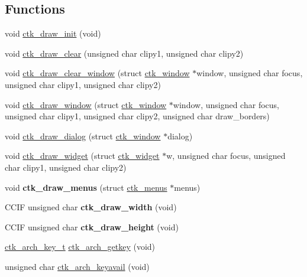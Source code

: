 \subsection*{Functions}
\begin{DoxyCompactItemize}
\item 
void \hyperlink{group__ctkdraw_ga271a33b474a94da63244e94c84127303}{ctk\+\_\+draw\+\_\+init} (void)
\item 
void \hyperlink{group__ctkdraw_gae6e8805e52467b2942c2af3e0080b6e1}{ctk\+\_\+draw\+\_\+clear} (unsigned char clipy1, unsigned char clipy2)
\item 
void \hyperlink{group__ctkdraw_gaeade88277aa23594cd8dc9f4caeba46d}{ctk\+\_\+draw\+\_\+clear\+\_\+window} (struct \hyperlink{structctk__window}{ctk\+\_\+window} $\ast$window, unsigned char focus, unsigned char clipy1, unsigned char clipy2)
\item 
void \hyperlink{group__ctkdraw_gae172d39b14556ee88707d4e6979abb34}{ctk\+\_\+draw\+\_\+window} (struct \hyperlink{structctk__window}{ctk\+\_\+window} $\ast$window, unsigned char focus, unsigned char clipy1, unsigned char clipy2, unsigned char draw\+\_\+borders)
\item 
void \hyperlink{group__ctkdraw_gae973e0af36f51f685e88216fa10ceb56}{ctk\+\_\+draw\+\_\+dialog} (struct \hyperlink{structctk__window}{ctk\+\_\+window} $\ast$dialog)
\item 
void \hyperlink{group__ctkdraw_ga2c09354ec5cfdb654b09cf478e8f2399}{ctk\+\_\+draw\+\_\+widget} (struct \hyperlink{structctk__widget}{ctk\+\_\+widget} $\ast$w, unsigned char focus, unsigned char clipy1, unsigned char clipy2)
\item 
\hypertarget{group__ctkdraw_gaa91a72c85f1c0a96ef85661b3b655067}{}void {\bfseries ctk\+\_\+draw\+\_\+menus} (struct \hyperlink{structctk__menus}{ctk\+\_\+menus} $\ast$menus)\label{group__ctkdraw_gaa91a72c85f1c0a96ef85661b3b655067}

\item 
\hypertarget{group__ctkdraw_ga573ade441a6b0b0ccbaf5f1ccc90fa9b}{}C\+C\+I\+F unsigned char {\bfseries ctk\+\_\+draw\+\_\+width} (void)\label{group__ctkdraw_ga573ade441a6b0b0ccbaf5f1ccc90fa9b}

\item 
\hypertarget{group__ctkdraw_gac8b314f484f9c768f337ab2daabf9318}{}C\+C\+I\+F unsigned char {\bfseries ctk\+\_\+draw\+\_\+height} (void)\label{group__ctkdraw_gac8b314f484f9c768f337ab2daabf9318}

\item 
\hyperlink{group__ctkdraw_gaa6eb41324497b3d828d208c0efa6fa90}{ctk\+\_\+arch\+\_\+key\+\_\+t} \hyperlink{group__ctkdraw_ga30c8437f37694ec49bd8bfef7ba0f6a0}{ctk\+\_\+arch\+\_\+getkey} (void)
\item 
unsigned char \hyperlink{group__ctkdraw_ga273c1f39eb29f14b9ca5f0a7d8db9d42}{ctk\+\_\+arch\+\_\+keyavail} (void)
\end{DoxyCompactItemize}
